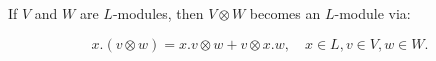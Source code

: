 If $V$ and $W$ are $L$-modules, then $V \otimes W$ becomes an $L$-module via:

$$x.(v \otimes w) = x.v \otimes w + v \otimes x.w, \quad x \in L, v \in V, w \in W.$$
